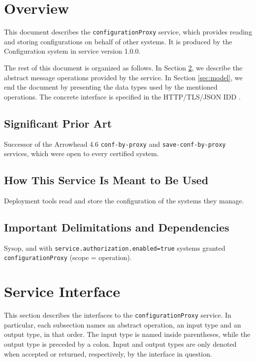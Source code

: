 \documentclass[a4paper]{arrowhead}
\begin{document}
\section{Overview}
\label{sec:overview}

This document describes the \texttt{configurationProxy} service, which provides reading and storing configurations on behalf of other systems.
It is produced by the Configuration system \cite{cfg-sysd} in service version 1.0.0.

The rest of this document is organized as follows.
In Section \ref{sec:operations}, we describe the abstract message operations provided by the service.
In Section \ref{sec:model}, we end the document by presenting the data types used by the mentioned operations.
The concrete interface is specified in the HTTP/TLS/JSON IDD \cite{cfg-configurationProxy-http-idd}.

\subsection{Significant Prior Art}

Successor of the Arrowhead 4.6 \texttt{conf-\allowbreak{}by-\allowbreak{}proxy} and \texttt{save-\allowbreak{}conf-\allowbreak{}by-\allowbreak{}proxy} services, which were open to every certified system.

\subsection{How This Service Is Meant to Be Used}

Deployment tools read and store the configuration of the systems they manage.

\subsection{Important Delimitations and Dependencies}
\label{sec:delimitations}

Sysop, and with \texttt{service.\allowbreak{}authorization.\allowbreak{}enabled=\allowbreak{}true} systems granted \texttt{configurationProxy} (scope = operation).

\newpage

\section{Service Interface}
\label{sec:operations}

This section describes the interfaces to the \texttt{configurationProxy} service.
In particular, each subsection names an abstract operation, an input type and an output type, in that order.
The input type is named inside parentheses, while the output type is preceded by a colon.
Input and output types are only denoted when accepted or returned, respectively, by the interface in question.
\end{document}
